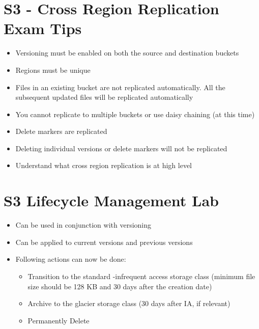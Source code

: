 \documentclass{article}
\begin{document}
\section{S3 - Cross Region Replication Exam Tips}
\begin{itemize}
\item
Versioning must be enabled on both the source and destination buckets

\item
Regions must be unique

\item
Files in an existing bucket are not replicated automatically. All the subsequent updated files will be replicated automatically

\item
You cannot replicate to multiple buckets or use daisy chaining (at this time)

\item
Delete markers are replicated

\item
Deleting individual versions or delete markers will not be replicated

\item
Understand what cross region replication is at high level

\end{itemize}

\section{S3 Lifecycle Management Lab}
\begin{itemize}

\item
Can be used in conjunction with versioning

\item
Can be applied to current versions and previous versions

\item
Following actions can now be done:
	\begin{itemize}
	\item
	Transition to the standard -infrequent access storage class (minimum file size should be 128 KB and 30 days after the creation date)
	
	\item
	Archive to the glacier storage class (30 days after IA, if relevant)
	
	\item
	Permanently Delete
	
	\end{itemize}

\end{itemize}
\end{document}
